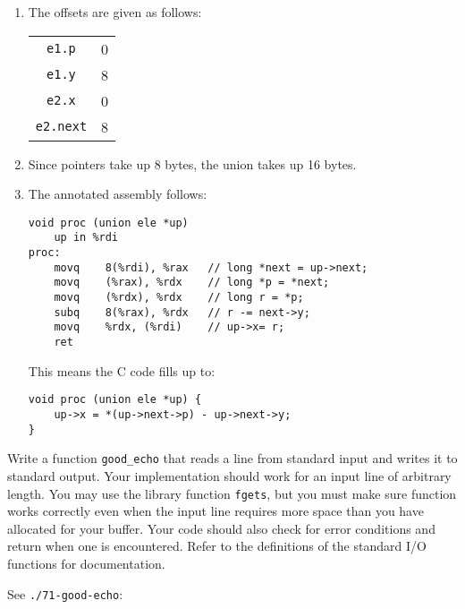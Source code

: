 \documentclass[12pt]{article}
\newenvironment{ex}[2][Exercise]{\begin{trivlist}
		\item[\hskip \labelsep {\bfseries #1}\hskip \labelsep {\bfseries #2.}]}{\end{trivlist}}
\newenvironment{sol}[1][Solution]{\begin{trivlist}
		\item[\hskip \labelsep {\bfseries #1:}]}{\end{trivlist}}
\begin{document}
{\begin{sol}
	\begin{enumerate}[label=(\alph*)]
		\item The offsets are given as follows:
		\begin{center}
			\begin{tabular}{cc}
				\texttt{e1.p} & 0\\
				\texttt{e1.y} & 8\\
				\texttt{e2.x} & 0\\
				\texttt{e2.next} & 8
			\end{tabular}
		\end{center}
		\item Since pointers take up 8 bytes, the union takes up
		16 bytes.
		\item The annotated assembly follows:
		\begin{lstlisting}[language={}]
	void proc (union ele *up)
	up in %rdi
proc:
	movq	8(%rdi), %rax	// long *next = up->next;
	movq	(%rax), %rdx	// long *p = *next;
	movq	(%rdx), %rdx	// long r = *p;
	subq	8(%rax), %rdx	// r -= next->y;
	movq	%rdx, (%rdi)	// up->x= r;
	ret
		\end{lstlisting}
		This means the C code fills up to:
		\begin{lstlisting}
void proc (union ele *up) {
	up->x = *(up->next->p) - up->next->y;
}
		\end{lstlisting}
	\end{enumerate}
\end{sol}

\begin{ex}{3.70}
	Write a function \texttt{good\_echo} that reads a line from standard
	input and writes it to standard output. Your implementation should work
	for an input line of arbitrary length. You may use the library function
	\texttt{fgets}, but you must make sure function works correctly even when
	the input line requires more space than you have allocated for your buffer.
	Your code should also check for error conditions and return when one is
	encountered. Refer to the definitions of the standard I/O functions for
	documentation.
\end{ex}

\begin{sol}
	See \texttt{./71-good-echo}:
	
\end{sol}
\end{document}
